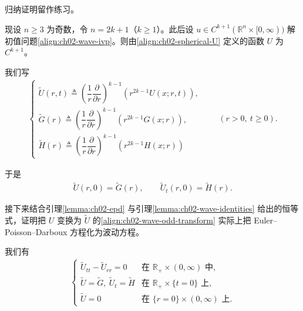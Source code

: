 \documentclass[../../main.tex]{subfiles}
\begin{document}
\noindent 归纳证明留作练习。

现设 $n\geqslant 3$ 为奇数，令 $n=2k+1$（$k\geqslant 1$）。此后设 $u\in C^{k+1}(\mathbb{R}^n\times[0,\infty))$ 解初值问题\eqref{align:ch02-wave-ivp}。则由\eqref{align:ch02-spherical-U} 定义的函数 $U$ 为 $C^{k+1}$。

\begin{definition}\label{definition:ch02-wave-odd-transform}
我们写
\begin{align}\label{align:ch02-wave-odd-transform}
\begin{cases}
\widetilde{U}(r,t)\triangleq\left(\dfrac{1}{r}\dfrac{\partial}{\partial r}\right)^{k-1}(r^{2k-1}U(x;r,t)),\\
\widetilde{G}(r)\triangleq\left(\dfrac{1}{r}\dfrac{\partial}{\partial r}\right)^{k-1}(r^{2k-1}G(x;r)),\\
\widetilde{H}(r)\triangleq\left(\dfrac{1}{r}\dfrac{\partial}{\partial r}\right)^{k-1}(r^{2k-1}H(x;r))
\end{cases}
\qquad (r>0,\ t\geqslant 0).
\end{align}
\end{definition}

于是
\begin{align}\label{align:ch02-wave-odd-initial}
\widetilde{U}(r,0)=\widetilde{G}(r),\qquad \widetilde{U}_t(r,0)=\widetilde{H}(r).
\end{align}

接下来结合引理\cref{lemma:ch02-epd} 与引理\cref{lemma:ch02-wave-identities} 给出的恒等式，证明把 $U$ 变换为 $\widetilde{U}$ 的\eqref{align:ch02-wave-odd-transform} 实际上把 Euler--Poisson--Darboux 方程化为波动方程。

\begin{lemma}\label{lemma:ch02-wave-odd}我们有
\begin{align*}
\begin{cases}
\widetilde{U}_{tt}-\widetilde{U}_{rr}=0 & \text{在 }\mathbb{R}_+\times(0,\infty)\text{ 中},\\
\widetilde{U}=\widetilde{G},\ \widetilde{U}_t=\widetilde{H} & \text{在 }\mathbb{R}_+\times\{t=0\}\text{ 上},\\
\widetilde{U}=0 & \text{在 }\{r=0\}\times(0,\infty)\text{ 上}.
\end{cases}
\end{align*}
\end{lemma}
\end{document}
